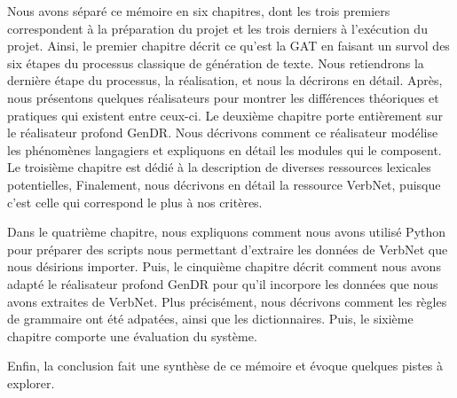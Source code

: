 Nous avons séparé ce mémoire en six chapitres, dont les trois premiers correspondent à la préparation du projet et les trois derniers à l'exécution du projet. Ainsi, le premier chapitre décrit ce qu'est la \ac{GAT} en faisant un survol des six étapes du processus classique de génération de texte. Nous retiendrons la dernière étape du processus, la réalisation, et nous la décrirons en détail. Après, nous présentons quelques réalisateurs pour montrer les différences théoriques et pratiques qui existent entre ceux-ci. Le deuxième chapitre porte entièrement sur le réalisateur profond GenDR. Nous décrivons comment ce réalisateur modélise les phénomènes langagiers et expliquons en détail les modules qui le composent. Le troisième chapitre est dédié à la description de diverses ressources lexicales potentielles,  Finalement, nous décrivons en détail la ressource VerbNet, puisque c'est celle qui correspond le plus à nos critères.

Dans le quatrième chapitre, nous expliquons comment nous avons utilisé Python pour préparer des scripts nous permettant d'extraire les données de VerbNet que nous désirions importer. Puis, le cinquième chapitre décrit comment nous avons adapté le réalisateur profond GenDR pour qu'il incorpore les données que nous avons extraites de VerbNet. Plus précisément, nous décrivons comment les règles de grammaire ont été adpatées, ainsi que les dictionnaires. Puis, le sixième chapitre comporte une évaluation du système.

Enfin, la conclusion fait une synthèse de ce mémoire et évoque quelques pistes à explorer.